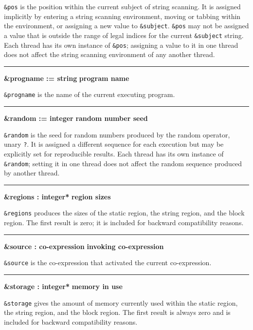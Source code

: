\noindent
{}\texttt{\&pos} is the position within the
current subject of string scanning. It is assigned implicitly by
entering a string scanning environment, moving or tabbing within the
environment, or assigning a new value to \texttt{\&subject}.
\texttt{\&pos} may not be assigned a value that is outside the range of
legal indices for the current \texttt{\&subject} string.
Each thread has its own instance of
\texttt{\&pos}; \ConcurrencyIssue assigning a value to it in one
thread does not affect the string scanning environment of any another thread.

\bigskip\hrule\vspace{0.1cm}
\noindent
{\bf \&progname := string } \hfill {\bf program name}

\noindent
{}\texttt{\&progname} is the name of the current
executing program.

\bigskip\hrule\vspace{0.1cm}
\noindent
{\bf \&random := integer } \hfill {\bf random number seed}

\noindent
{}\texttt{\&random} is the seed for random
numbers produced by the random operator, unary \texttt{?}. It is
assigned a different sequence for each execution but may be explicitly
set for reproducible results. Each thread has its own instance of
\texttt{\&random}; \ConcurrencyIssue setting it in one thread does
not affect the random sequence produced by another thread.
\bigskip\hrule\vspace{0.1cm}
\noindent
{\bf \&regions : integer* } \hfill {\bf region sizes}

\noindent
{}\texttt{\&regions} produces the sizes of the static
region, the string region, and the block region. The first result is
zero; it is included for backward compatibility reasons.

\bigskip\hrule\vspace{0.1cm}
\noindent
{\bf \&source : co{}-expression } \hfill {\bf invoking co{}-expression}

\noindent
\texttt{\&source} is the co-expression that activated the current
co-expression.

\bigskip\hrule\vspace{0.1cm}
\noindent
{\bf \&storage : integer* } \hfill {\bf memory in use}

\noindent
{}\texttt{\&storage} gives the amount of memory
currently used within the static region, the string region, and the
block region. The first result is always zero and is included for
backward compatibility reasons.


